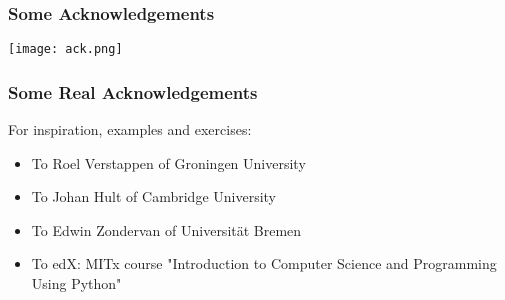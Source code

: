 
\begin{frame}
 \frametitle{Some Acknowledgements}
 \centering\texttt{[image: ack.png]}
\end{frame}

\begin{frame}
 \frametitle{Some Real Acknowledgements}
 For inspiration, examples and exercises:
 \begin{itemize}
  \item To Roel Verstappen of Groningen University
  \item To Johan Hult of Cambridge University
  \item To Edwin Zondervan of Universit\"at Bremen
  \item To edX: MITx course  "Introduction to Computer Science and Programming Using Python"
 \end{itemize}
\end{frame}
% 



